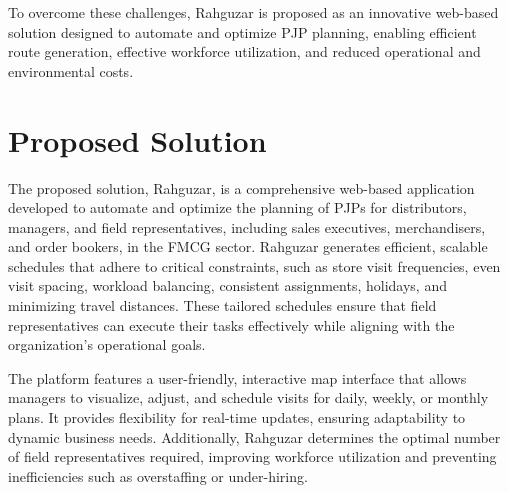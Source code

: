 
To overcome these challenges, Rahguzar is proposed as an innovative web-based solution designed to automate and optimize PJP planning, enabling efficient route generation, effective workforce utilization, and reduced operational and environmental costs.
\section{Proposed Solution}


The proposed solution, Rahguzar, is a comprehensive web-based application developed to automate and optimize the planning of PJPs for distributors, managers, and field representatives, including sales executives, merchandisers, and order bookers, in the FMCG sector. Rahguzar generates efficient, scalable schedules that adhere to critical constraints, such as store visit frequencies, even visit spacing, workload balancing, consistent assignments, holidays, and minimizing travel distances. These tailored schedules ensure that field representatives can execute their tasks effectively while aligning with the organization’s operational goals.

The platform features a user-friendly, interactive map interface that allows managers to visualize, adjust, and schedule visits for daily, weekly, or monthly plans. It provides flexibility for real-time updates, ensuring adaptability to dynamic business needs. Additionally, Rahguzar determines the optimal number of field representatives required, improving workforce utilization and preventing inefficiencies such as overstaffing or under-hiring.

